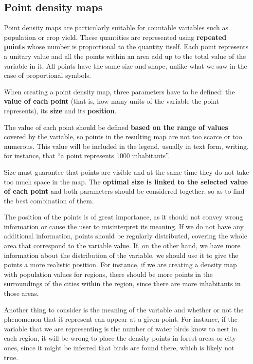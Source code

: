 \subsection{Point density maps}

Point density maps are particularly suitable for countable variables such as population or crop yield. These quantities are represented using \textbf{repeated points} whose number is proportional to the quantity itself. Each point represents a unitary value and all the points within an area add up to the total value of the variable in it. All points have the same size and shape, unlike what we saw in the case of proportional symbols.

When creating a point density map, three parameters have to be defined: the \textbf{value of each point} (that is, how many units of the variable the point represents), its \textbf{size} and its \textbf{position}.

The value of each point should be defined \textbf{based on the range of values} covered by the variable, so points in the resulting map are not too scarce or too numerous. This value will be included in the legend, usually in text form, writing, for instance, that ``a point represents 1000 inhabitants''.

Size must guarantee that points are visible and at the same time they do not take too much space in the map. The \textbf{optimal size is linked to the selected value of each point} and both parameters should be considered together, so as to find the best combination of them. 

The position of the points is of great importance, as it should not convey wrong information or cause the user to misinterpret its meaning. If we do not have any additional information, points should be regularly distributed, covering the whole area that correspond to the variable value. If, on the other hand, we have more information about the distribution of the variable, we should use it to give the points a more realistic position. For instance, if we are creating a density map with population values for regions, there should be more points in the surroundings of the cities within the region, since there are more inhabitants in those areas.

Another thing to consider is the meaning of the variable and whether or not the phenomenon that it represent can appear at a given point. For instance, if the variable that we are representing is the number of water birds know to nest in each region, it will be wrong to place the density points in forest areas or city ones, since it might be inferred that birds are found there, which is likely not true.

